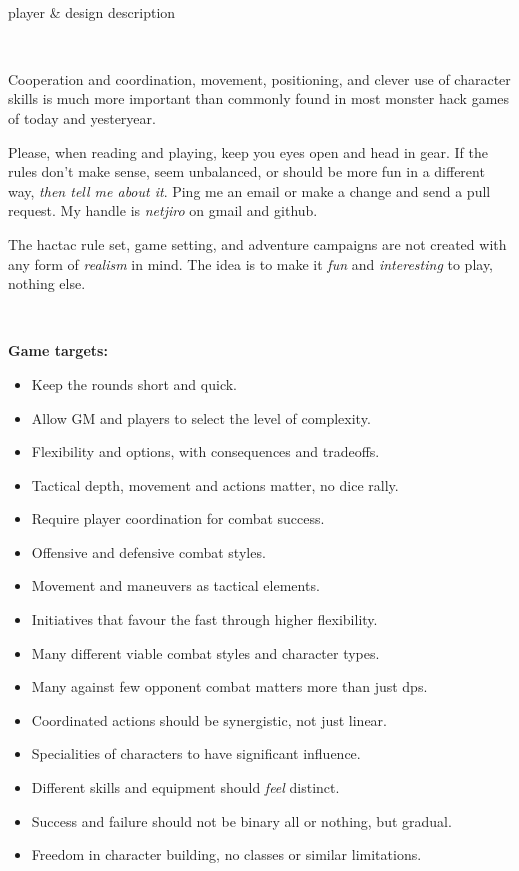 \

\todo  player \& design description

\

Cooperation and coordination, movement, positioning, and clever use of character skills is much more important than commonly found in most monster hack games of today and yesteryear.

Please, when reading and playing, keep you eyes open and head in gear. If the rules don't make sense, seem unbalanced, or should be more fun in a different way, \emph{then tell me about it}. Ping me an email or make a change and send a pull request. My handle is \emph{netjiro} on gmail and github.

The hactac rule set, game setting, and adventure campaigns are not created with any form of \emph{realism} in mind. The idea is to make it \emph{fun} and \emph{interesting} to play, nothing else.

\

\textbf{Game targets:}
\begin{itemize}
    \item Keep the rounds short and quick.
    \item Allow GM and players to select the level of complexity.
    \item Flexibility and options, with consequences and tradeoffs.
    \item Tactical depth, movement and actions matter, no dice rally.
    \item Require player coordination for combat success.
    \item Offensive and defensive combat styles.
    \item Movement and maneuvers as tactical elements.
    \item Initiatives that favour the fast through higher flexibility.
    \item Many different viable combat styles and character types.
    \item Many against few opponent combat matters more than just dps.
    \item Coordinated actions should be synergistic, not just linear.
    \item Specialities of characters to have significant influence.
    \item Different skills and equipment should \emph{feel} distinct.
    \item Success and failure should not be binary all or nothing, but gradual.
    \item Freedom in character building, no classes or similar limitations.
\end{itemize}

